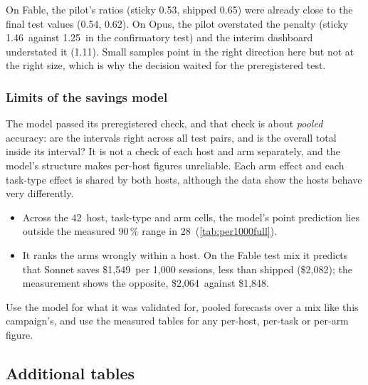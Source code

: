 \documentclass[11pt,letterpaper]{article}
\newcommand{\CfOpusStickyPairTwo}{1.25}
\newcommand{\FinalTestFableShipped}{0.62}
\newcommand{\FinalTestFableSticky}{0.54}
\newcommand{\InterimOpusSticky}{1.11}
\newcommand{\ModelCells}{42}
\newcommand{\ModelOutside}{28}
\newcommand{\PilotFableShipped}{0.65}
\newcommand{\PilotFableSticky}{0.53}
\newcommand{\PilotOpusSticky}{1.46}
\newcommand{\TestMixFableShippedModel}{2{,}082}
\newcommand{\TestMixFableShippedObs}{1{,}848}
\newcommand{\TestMixFableSonnetModel}{1{,}549}
\newcommand{\TestMixFableSonnetObs}{2{,}064}
\begin{document}
On Fable, the pilot's ratios (sticky \PilotFableSticky, shipped \PilotFableShipped) were already close to the
final test values (\FinalTestFableSticky, \FinalTestFableShipped). On Opus, the pilot overstated the
penalty (sticky \PilotOpusSticky\ against \CfOpusStickyPairTwo\ in the confirmatory test) and the interim
dashboard understated it (\InterimOpusSticky). Small samples point in the right direction here but not at the
right size, which is why the decision waited for the preregistered test.

\subsubsection{Limits of the savings model}\label{vt:sec:modellimits}

The model passed its preregistered check, and that check is about \emph{pooled} accuracy: are the intervals
right across all test pairs, and is the overall total inside its interval? It is not a check of each host and
arm separately, and the model's structure makes per-host figures unreliable. Each arm effect and each
task-type effect is shared by both hosts, although the data show the hosts behave very differently.
\begin{itemize}
  \item Across the \ModelCells\ host, task-type and arm cells, the model's point prediction lies outside the
    measured 90\,\% range in \ModelOutside\ (\cref{tab:per1000full}).
  \item It ranks the arms wrongly within a host. On the Fable test mix it predicts that Sonnet saves
    \$\TestMixFableSonnetModel\ per 1,000 sessions, less than shipped (\$\TestMixFableShippedModel); the
    measurement shows the opposite, \$\TestMixFableSonnetObs\ against \$\TestMixFableShippedObs.
\end{itemize}
Use the model for what it was validated for, pooled forecasts over a mix like this campaign's, and use the
measured tables for any per-host, per-task or per-arm figure.
\subsection{Additional tables}\label{vt:app:tables}
\end{document}
